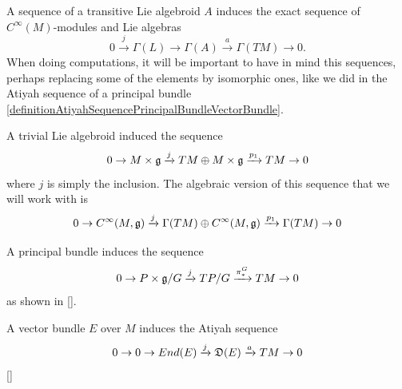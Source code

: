\begin{remark}
A sequence of a transitive Lie algebroid $A$ induces the exact sequence of $C^\infty(M)$-modules and Lie algebras
\begin{equation}
    \label{moduleTransitiveSequence}
    0 \xrightarrow{j} \Gamma(L) \to  \Gamma(A) \xrightarrow{a} \Gamma(TM) \to 0.
\end{equation}
 When doing computations, it will be important to have in mind this sequences, perhaps replacing some of the elements by isomorphic ones, like we did in the Atiyah sequence of a principal bundle \ref{definitionAtiyahSequencePrincipalBundleVectorBundle}.
\end{remark}

\begin{example}
A trivial Lie algebroid induced the  sequence
\begin{equation}
     0 \to M \times \mathfrak{g} \xrightarrow{j} TM \oplus M \times \mathfrak{g}  \xrightarrow{p_1} TM \to 0
\end{equation}
where $j$ is simply the inclusion. The algebraic version of this sequence that we will work with is
\begin{equation}
     0 \to C^\infty(M, \mathfrak{g}) \xrightarrow{j} \Gamma(TM) \oplus C^\infty(M, \mathfrak{g})  \xrightarrow{p_1} \Gamma(TM) \to 0
\end{equation}
\end{example}

\begin{example}
A principal bundle induces the sequence
\begin{equation}
    0 \to P \times \mathfrak{g}/G \xrightarrow{j} TP/G \xrightarrow{\pi_*^G} TM \to 0
\end{equation}
as shown in \ref{}.
\end{example}

\begin{example}
A vector bundle $E$ over $M$ induces the Atiyah sequence
\begin{equation}
0 \to 0 \to End(E) \xrightarrow{j} \mathfrak{D}(E)  \xrightarrow{a} TM \to 0
\end{equation} \ref{}
\end{example}

